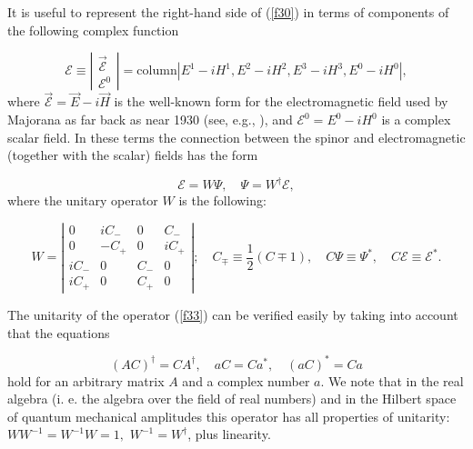 \documentclass[a4paper,12pt]{article}
\begin{document}
It is useful to represent the right-hand side of (\ref{f30}) in terms of
components of the following complex function

\begin{equation}  \label{f31}
\mathcal{E}\equiv \left|
\begin{array}{c}
\overrightarrow{\mathcal{E}} \\
\mathcal{E}^0
\end{array}
\right| =\mathrm{column}\left| E^1-iH^1,E^2-iH^2,E^3-iH^3,E^0-iH^0\right| ,
\end{equation}
where $\overrightarrow{\mathcal{E}}=\overrightarrow{E}-i\overrightarrow{H}$
is the well-known form for the electromagnetic field used by Majorana as far
back as near 1930 (see, e.g., \cite{DAR}), and $\mathcal{E}^0=E^0-iH^0$ is a
complex scalar field. In these terms the connection between the spinor and
electromagnetic (together with the scalar) fields has the form

\begin{equation}
\mathcal{E}=W\Psi, \quad \Psi =W^{\dagger }\mathcal{E},  \label{f32}
\end{equation}
where the unitary operator $W$ is the following:

\begin{equation}
W=\left|
\begin{array}{cccc}
0 & iC_{-} & 0 & C_{-} \\
0 & -C_{+} & 0 & iC_{+} \\
iC_{-} & 0 & C_{-} & 0 \\
iC_{+} & 0 & C_{+} & 0
\end{array}
\right|; \quad C_{\mp }\equiv \frac 12(C\mp 1), \quad C\Psi \equiv \Psi
^{*}, \quad C\mathcal{E}\equiv \mathcal{E}^{*}.  \label{f33}
\end{equation}

The unitarity of the operator (\ref{f33}) can be verified easily by taking
into account that the equations

\begin{equation}
\left( AC\right) ^{\dagger }=CA^{\dagger },\quad aC=Ca^{*},\quad \left(
aC\right) ^{*}=Ca  \label{f34}
\end{equation}
hold for an arbitrary matrix $A$ and a complex number $a$. We note that in
the real algebra (i. e. the algebra over the field of real numbers) and in
the Hilbert space of quantum mechanical amplitudes this operator has all
properties of unitarity: $WW^{-1}=W^{-1}W=1,$ $W^{-1}=W^{\dagger }$, plus
linearity.
\end{document}
